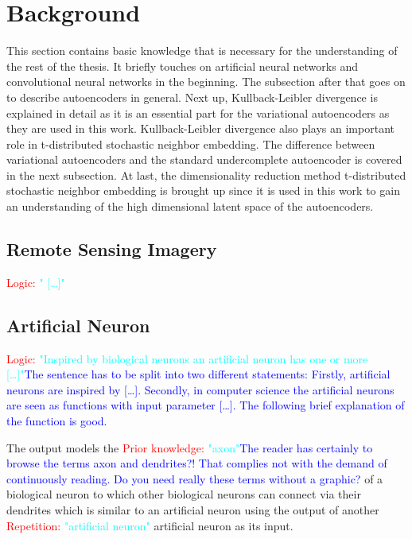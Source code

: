 \section{Background}

This section contains basic knowledge that is necessary for the understanding of the rest of the thesis.
It briefly touches on artificial neural networks and convolutional neural networks in the beginning.
The subsection after that goes on to describe autoencoders in general. Next up, Kullback-Leibler divergence
is explained in detail as it is an essential part for the variational autoencoders as they are used in this
work. Kullback-Leibler divergence also plays an important role in t-distributed stochastic neighbor embedding.
The difference between variational autoencoders and the standard undercomplete autoencoder is covered in the 
next subsection. At last, the dimensionality reduction method 
t-distributed stochastic neighbor embedding is brought up since it is used in this work to gain an 
understanding of the high dimensional latent space of the autoencoders.

\subsection{Remote Sensing Imagery}


\textcolor{red}{Logic:} \textcolor{cyan}{" [\dots]"}\textcolor{blue}{}

\subsection{Artificial Neuron}\label{ssec:an}

\textcolor{red}{Logic:} \textcolor{cyan}{"Inspired by biological neurons an artificial neuron has one or more [\dots]"}\textcolor{blue}{The sentence has to be split into two different statements: Firstly, artificial neurons are inspired by [\dots]. Secondly, in computer science the artificial neurons are seen as functions with input parameter [\dots]. The following brief explanation of the function is good.} 

 The output models the \textcolor{red}{Prior knowledge:} \textcolor{cyan}{"axon"}\textcolor{blue}{The reader has certainly to browse the terms axon and dendrites?! That complies not with the demand of continuously reading. Do you need really these terms without a graphic?}
of a biological neuron to which other biological neurons can connect via their dendrites which is similar
to an artificial neuron using the output of another  \textcolor{red}{Repetition:} \textcolor{cyan}{"artificial neuron"} artificial neuron as its input. 


